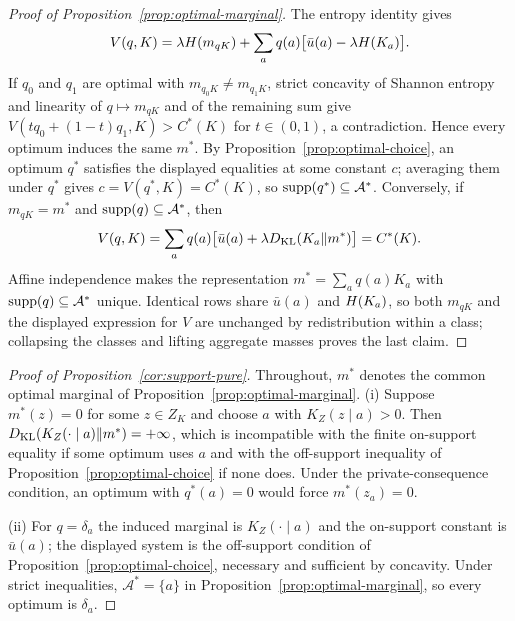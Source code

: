 \begin{proof}[Proof of Proposition~\ref{prop:optimal-marginal}]
The entropy identity gives
\[
 V(q,K)
 =\lambda H(m_{qK})
  +\sum_aq(a)\bigl[\bar u(a)-\lambda H(K_a)\bigr].
\]
If $q_0$ and $q_1$ are optimal with $m_{q_0K}\ne m_{q_1K}$, strict concavity of Shannon entropy and linearity of
$q\mapsto m_{qK}$ and of the remaining sum give $V(tq_0+(1-t)q_1,K)>C^*(K)$ for $t\in(0,1)$, a contradiction.
Hence every optimum induces the same $m^*$.  By Proposition~\ref{prop:optimal-choice}, an optimum $q^*$ satisfies
the displayed equalities at some constant $c$; averaging them under $q^*$ gives $c=V(q^*,K)=C^*(K)$, so
$\operatorname{supp}(q^*)\subseteq\mathcal A^*$.  Conversely, if $m_{qK}=m^*$ and $\operatorname{supp}(q)\subseteq\mathcal A^*$, then
\[
 V(q,K)
 =\sum_aq(a)\bigl[\bar u(a)+\lambda D_{\mathrm{KL}}(K_a\|m^*)\bigr]
 =C^*(K).
\]
Affine independence makes the representation $m^*=\sum_aq(a)K_a$ with $\operatorname{supp}(q)\subseteq\mathcal A^*$ unique.
Identical rows share $\bar u(a)$ and $H(K_a)$, so both $m_{qK}$ and the displayed expression for $V$ are
unchanged by redistribution within a class; collapsing the classes and lifting aggregate masses proves the last
claim.
\end{proof}

\begin{proof}[Proof of Proposition~\ref{cor:support-pure}]
Throughout, $m^*$ denotes the common optimal marginal of Proposition~\ref{prop:optimal-marginal}.
(i) Suppose $m^*(z)=0$ for some $z\in Z_K$ and choose $a$ with $K_Z(z\mid a)>0$.  Then
$D_{\mathrm{KL}}(K_Z(\cdot\mid a)\|m^*)=+\infty$, which is incompatible with the finite on-support equality if some optimum
uses $a$ and with the off-support inequality of Proposition~\ref{prop:optimal-choice} if none does.  Under the
private-consequence condition, an optimum with $q^*(a)=0$ would force $m^*(z_a)=0$.

(ii) For $q=\delta_a$ the induced marginal is $K_Z(\cdot\mid a)$ and the on-support constant is $\bar u(a)$; the
displayed system is the off-support condition of Proposition~\ref{prop:optimal-choice}, necessary and sufficient by
concavity.  Under strict inequalities, $\mathcal A^*=\{a\}$ in Proposition~\ref{prop:optimal-marginal}, so every
optimum is $\delta_a$.
\end{proof}

